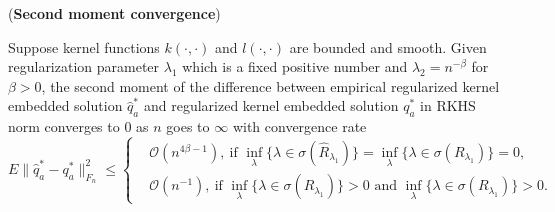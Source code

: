 \begin{corollary}(\textbf{Second moment convergence})
    
    \label{cor: est_secondempiricaltokernel}
    Suppose kernel functions $k(\cdot,\cdot)$ and $l(\cdot,\cdot)$ are bounded and smooth. 
    Given regularization parameter $\lambda_1$ which is a fixed positive number 
    and $\lambda_2=n^{-\beta}$ for $\beta>0$, 
    the second moment of the difference between empirical regularized kernel embedded solution $\widehat{q}_a^*$ 
    and regularized kernel embedded solution $q_a^*$ in RKHS norm converges to 0 as $n$ goes to $\infty$ with convergence rate 
    \begin{equation*}
        E\|\widehat{q}_a^*-q_a^*\|^2_{F_n} \leq\left\{\begin{aligned}
            & \mathcal{O}(n^{4\beta-1}),\ \text{if }\inf_{\lambda}\{\lambda\in\sigma(\widehat{R}_{\lambda_1})\} = \inf_{\lambda}\{\lambda\in\sigma(R_{\lambda_1})\} = 0, \\
            & \mathcal{O}(n^{-1}),\ \text{if }\inf_{\lambda}\{\lambda\in\sigma(\widehat{R}_{\lambda_1})\}>0 \text{ and } \inf_{\lambda}\{\lambda\in\sigma(R_{\lambda_1})\} > 0.
        \end{aligned}\right.
    \end{equation*}
\end{corollary}
